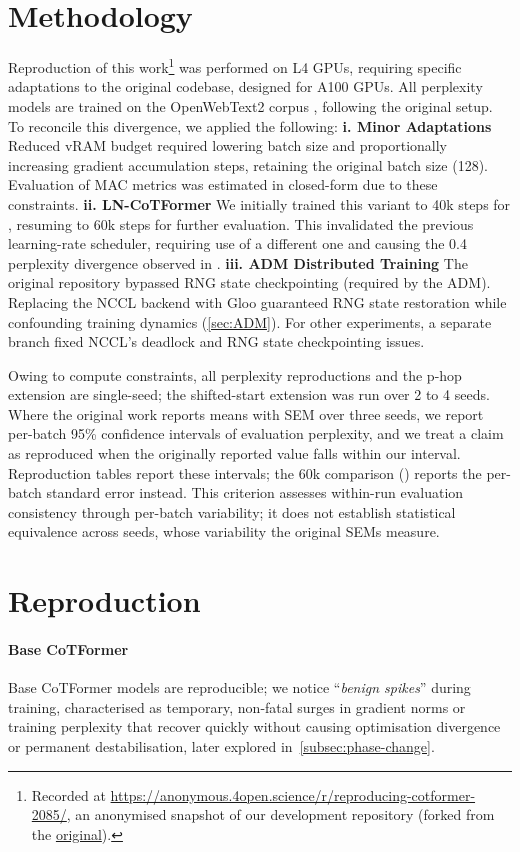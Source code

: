 \documentclass[10pt]{article}
\newcommand{\anonrepo}{\url{https://anonymous.4open.science/r/reproducing-cotformer-2085/}}
\begin{document}
\section{Methodology}\label{sec:methodology}
Reproduction of this work\footnote{Recorded at \anonrepo, an anonymised snapshot of our development repository (forked from the \href{https://github.com/epfml/CoTFormer}{original}).} was performed on L4 GPUs, requiring specific adaptations to the original codebase, designed for A100 GPUs. All perplexity models are trained on the OpenWebText2 corpus \citep{gao2020pile}, following the original setup. To reconcile this divergence, we applied the following: \textbf{i. Minor Adaptations} Reduced vRAM budget required lowering batch size and proportionally increasing gradient accumulation steps, retaining the original batch size (128). Evaluation of MAC metrics was estimated in closed-form due to these constraints. \textbf{ii. LN-CoTFormer} We initially trained this variant to 40k steps for , resuming to 60k steps for further evaluation. This invalidated the previous learning-rate scheduler, requiring use of a different one and causing the 0.4 perplexity divergence observed in . \textbf{iii. ADM Distributed Training} The original repository bypassed RNG state checkpointing (required by the ADM). Replacing the NCCL backend with Gloo guaranteed RNG state restoration while confounding training dynamics (\cref{sec:ADM}). For other experiments, a separate branch fixed NCCL's deadlock and RNG state checkpointing issues.

Owing to compute constraints, all perplexity reproductions and the p-hop extension are single-seed; the shifted-start extension was run over 2 to 4 seeds. Where the original work reports means with SEM over three seeds, we report per-batch 95\% confidence intervals of evaluation perplexity, and we treat a claim as reproduced when the originally reported value falls within our interval. Reproduction tables report these intervals; the 60k comparison () reports the per-batch standard error instead. This criterion assesses within-run evaluation consistency through per-batch variability; it does not establish statistical equivalence across seeds, whose variability the original SEMs measure.

\section{Reproduction}
\paragraph{Base CoTFormer}
Base CoTFormer models are reproducible; we notice ``\emph{benign spikes}'' during training, characterised as temporary, non-fatal surges in gradient norms or training perplexity that recover quickly without causing optimisation divergence or permanent destabilisation, later explored in~\cref{subsec:phase-change}.
\end{document}
